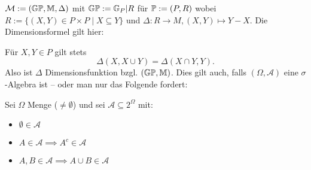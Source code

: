 \begin{beispiel}
    \label{ex:TeilmengenMeasurementSetup}
    $\mathcal{M} := (\G\P, \M, \Delta)$ mit $\G\P := \G_P|R$ für $\P:=(P,R)$ wobei $R := \{(X,Y) \in P\times P \mid X \subseteq Y\}$
    und $\Delta: R \to M, (X,Y) \mapsto Y-X$.\nl
    Die Dimensionsformel gilt hier:

    Für $X,Y \in P$ gilt stets $$\Delta(X,X\cup Y) = \Delta(X\cap Y,Y).$$
    Also ist $\Delta$ Dimensionsfunktion bzgl. $(\G\P,\M)$.\nl
    Dies gilt auch, falls $(\Omega, \mathscr{A})$ eine $\sigma$-Algebra ist --
    oder man nur das Folgende fordert:

    Sei $\Omega$ Menge ($\ne \emptyset$) und sei $\mathscr{A} \subseteq 2^\Omega$ mit:
    \begin{itemize}
        \item $\emptyset\in \mathscr{A}$
        \item $A \in \mathscr{A} \implies A^c \in \mathscr{A}$
        \item $A,B \in \mathscr{A} \implies A \cup B \in \mathscr{A}$
    \end{itemize}


\end{beispiel}
